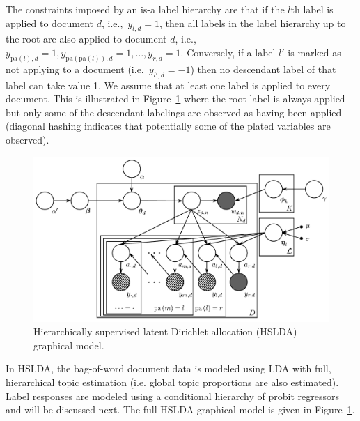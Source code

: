 The constraints imposed by an is-a label hierarchy are that if the $l$th label is applied to document $d$, i.e.,~$y_{l,d} = 1$, then all labels in the label hierarchy up to the root are also applied to document $d$, i.e.,~$y_{\mathrm{pa}(l),d} = 1, y_{\mathrm{pa}(\mathrm{pa}(l)),d} = 1, \ldots, y_{r,d}=1.$  Conversely, if a label $l'$ is marked as not applying to a document (i.e.~$y_{l',d}=-1$) then no descendant label of that label can take value 1.   We assume that at least one label is applied to every document.  This is illustrated in Figure~\ref{fig:graphical_model} where the root label is always applied but only some of the descendant labelings are observed as having been applied (diagonal hashing indicates that potentially some of the plated variables are observed).

%
\begin{figure}[t]
 \centering \includegraphics[scale=0.4]{Chapters/chapter1/Graphical_Model-final} \caption{Hierarchically supervised latent Dirichlet allocation (HSLDA) graphical model.}


\label{fig:graphical_model} 
\end{figure}

In HSLDA, the bag-of-word document data is modeled using LDA with
 full, hierarchical topic estimation (i.e. global topic proportions are also estimated).
Label responses are modeled using a conditional
hierarchy of probit regressors and will be discussed next. The full HSLDA graphical model is given in
Figure~\ref{fig:graphical_model}.

